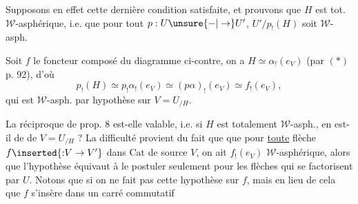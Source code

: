 
Supposons en effet cette dernière condition satisfaite, et prouvons que $H$ est tot. $\mathcal W$-asphérique, i.e. que pour tout $p:U\unsure{-|\to}U'$, $U'/p_!(H)$ soit $\mathcal W$-asph.


Soit $f$ le foncteur composé du diagramme ci-contre, on a $H\simeq\alpha_!(e_V)$  (par $(*)$ p. 92), d'où
\[
p_!(H)\simeq p_!\alpha_!(e_V)\simeq(p\alpha)_!(e_V)\simeq f_!(e_V),
\]
qui est $\mathcal W$-asph. par hypothèse sur $V=U_{/H}$.

La réciproque de prop. 8 est-elle valable, i.e. si $H$ est totalement $\mathcal W$-asph., en est-il de  de $V=U_{/H}$ ? La difficulté provient du fait que    que pour \uline{toute} flèche $f\inserted{{:}V\to V'}$ dans $\mathrm{Cat}$ de source $V$, on ait $f_!(e_V)$ $\mathcal W$-asphérique, alors que l'hypothèse  équivaut à le postuler seulement pour les flèches qui se factorisent par $U$. Notons que si on ne fait pas cette hypothèse sur $f$, mais  en lieu de cela que $f$ s'insère dans un carré commutatif

